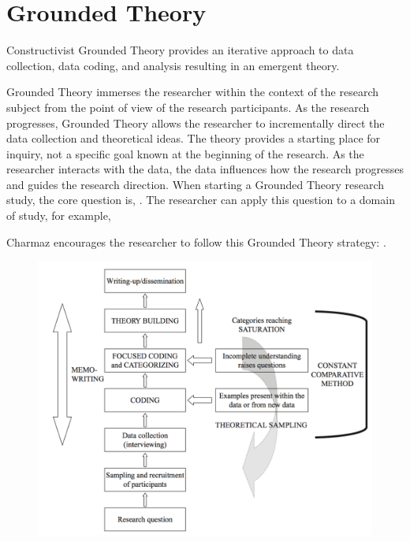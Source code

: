 
\chapter{Grounded Theory}
\label{ConstructivistGroundedTheory}
Constructivist Grounded Theory \cite{Charmaz} provides an iterative approach to data collection, data coding, and analysis resulting in an emergent theory. 

Grounded Theory immerses the researcher within the context of the research subject from the point of view of the research participants. As the research progresses, Grounded Theory allows the researcher to incrementally direct the data collection and theoretical ideas. The theory provides a starting place for inquiry, not a specific goal known at the beginning of the research. As the researcher interacts with the data, the data influences how the research progresses and guides the research direction. When starting a Grounded Theory research study, the core question is,  \cite{GlaserTheoreticalSensitivity}. The researcher can apply this question to a domain of study, for example, 

Charmaz encourages the researcher to follow this Grounded Theory strategy:  \cite{Charmaz}.

\begin{figure}[t]
\centering
{}
\includegraphics[width=6.4in]{grounded_theory_images/tweed_grounded_theory.png}
\end{figure}

